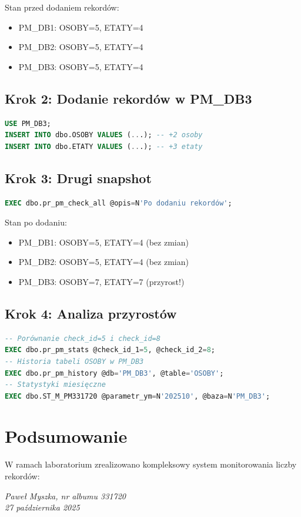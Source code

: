 \documentclass[a4paper,11pt]{article}
\begin{document}
	Stan przed dodaniem rekordów:
	\begin{itemize}
		\item PM\_DB1: OSOBY=5, ETATY=4
		\item PM\_DB2: OSOBY=5, ETATY=4
		\item PM\_DB3: OSOBY=5, ETATY=4
	\end{itemize}
	
	\subsection{Krok 2: Dodanie rekordów w PM\_DB3}
	\begin{lstlisting}[language=SQL]
USE PM_DB3;
INSERT INTO dbo.OSOBY VALUES (...); -- +2 osoby
INSERT INTO dbo.ETATY VALUES (...); -- +3 etaty
	\end{lstlisting}
	
	\subsection{Krok 3: Drugi snapshot}
	\begin{lstlisting}[language=SQL]
EXEC dbo.pr_pm_check_all @opis=N'Po dodaniu rekordów';
	\end{lstlisting}
	
	Stan po dodaniu:
	\begin{itemize}
		\item PM\_DB1: OSOBY=5, ETATY=4 (bez zmian)
		\item PM\_DB2: OSOBY=5, ETATY=4 (bez zmian)
		\item PM\_DB3: OSOBY=7, ETATY=7 (przyrost!)
	\end{itemize}
	
	\subsection{Krok 4: Analiza przyrostów}
	\begin{lstlisting}[language=SQL]
-- Porównanie check_id=5 i check_id=8
EXEC dbo.pr_pm_stats @check_id_1=5, @check_id_2=8;
-- Historia tabeli OSOBY w PM_DB3
EXEC dbo.pr_pm_history @db='PM_DB3', @table='OSOBY';
-- Statystyki miesięczne
EXEC dbo.ST_M_PM331720 @parametr_ym=N'202510', @baza=N'PM_DB3';
	\end{lstlisting}
	
	\section{Podsumowanie}
	
	W ramach laboratorium zrealizowano kompleksowy system monitorowania liczby rekordów:

	\vspace{1cm}
	
	\begin{center}
		\textit{Paweł Myszka, nr albumu 331720}\\
		\textit{27 października 2025}
	\end{center}
	
\end{document}
